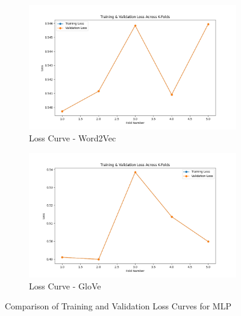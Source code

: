 \begin{figure}[H]
    \begin{subfigure}[b]{0.48\textwidth}
        \includegraphics[width=\textwidth]{img/report_info/img/2.2.MLP/best_mlp_word2vec_loss.png}
        \caption{Loss Curve - Word2Vec}
        \label{fig:mlp-word2vec-loss}
    \end{subfigure}
    \begin{subfigure}[b]{0.48\textwidth}
        \includegraphics[width=\textwidth]{img/report_info/img/2.2.MLP/best_mlp_glove_loss.png}
        \caption{Loss Curve - GloVe}
        \label{fig:mlp-glove-loss}
    \end{subfigure}
    
    \caption{Comparison of Training and Validation Loss Curves for MLP}
    \label{fig:mlp-loss-group}
\end{figure}

